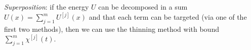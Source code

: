     \emph{Superposition}: if the energy $U$ can be decomposed in a sum $U(x)=\sum_{j=1}^{m}U^{[j]}(x)$ and that each term can be targeted (via one of the first two methods), then we can use the thinning method with bound $\sum_{j=1}^{m}\chi^{[j]}(t)$.


%


